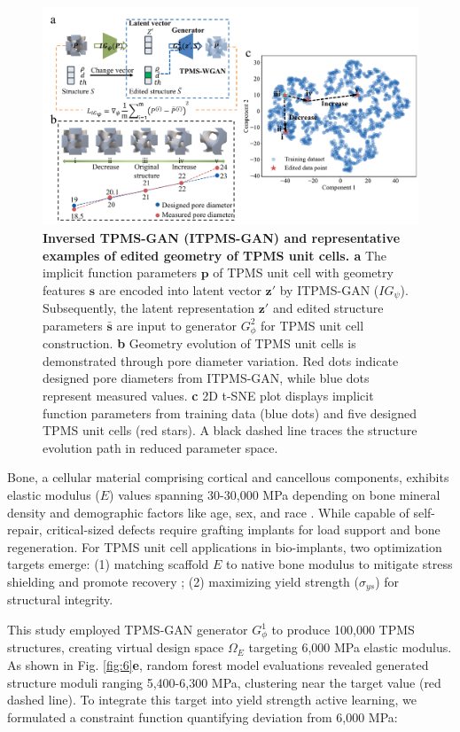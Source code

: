 \documentclass[preprint,review,12pt,authoryear]{elsarticle}
\begin{document}
\begin{figure}
    \centering
    \includegraphics[width=1\linewidth]{figures/5.pdf}
    \caption{\textbf{Inversed TPMS-GAN (ITPMS-GAN) and representative examples of edited geometry of TPMS unit cells. a} The implicit function parameters $\boldsymbol{p}$ of TPMS unit cell with geometry features $\boldsymbol{s}$ are encoded into latent vector $\boldsymbol{z}'$ by ITPMS-GAN ($IG_\psi$). Subsequently, the latent representation $\boldsymbol{z}'$ and edited structure parameters $\bar{\boldsymbol{s}}$ are input to generator $G_\phi^2$ for TPMS unit cell construction. \textbf{b} Geometry evolution of TPMS unit cells is demonstrated through pore diameter variation. Red dots indicate designed pore diameters from ITPMS-GAN, while blue dots represent measured values. \textbf{c} 2D t-SNE plot displays implicit function parameters from training data (blue dots) and five designed TPMS unit cells (red stars). A black dashed line traces the structure evolution path in reduced parameter space.}
    \label{fig:5}
\end{figure}

Bone, a cellular material comprising cortical and cancellous components, exhibits elastic modulus ($E$) values spanning 30-30,000 MPa depending on bone mineral density and demographic factors like age, sex, and race \citep{Wang2016}. While capable of self-repair, critical-sized defects require grafting implants for load support and bone regeneration. For TPMS unit cell applications in bio-implants, two optimization targets emerge: (1) matching scaffold $E$ to native bone modulus to mitigate stress shielding and promote recovery \citep{Yang2020}; (2) maximizing yield strength ($\sigma_{ys}$) for structural integrity.

This study employed TPMS-GAN generator $G_\phi^1$ to produce 100,000 TPMS structures, creating virtual design space $\Omega_E$ targeting 6,000 MPa elastic modulus. As shown in Fig. \ref{fig:6}\textbf{e}, random forest model evaluations revealed generated structure moduli ranging 5,400-6,300 MPa, clustering near the target value (red dashed line). To integrate this target into yield strength active learning, we formulated a constraint function quantifying deviation from 6,000 MPa:
\end{document}
